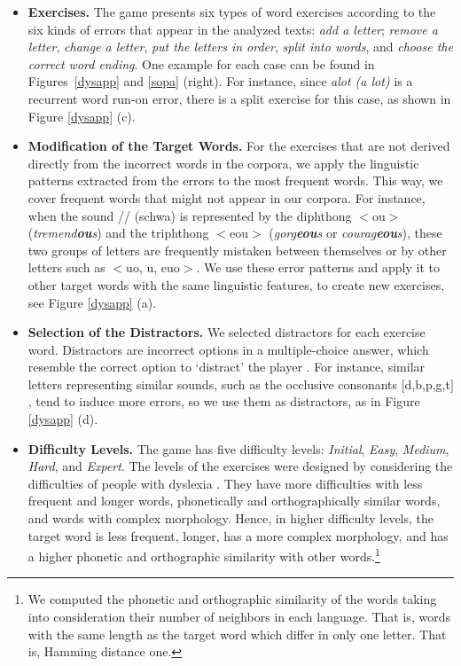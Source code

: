 \documentclass[letterpaper]{sig-alternate-2013}
\begin{document}
\begin{itemize}
\item[(1)]{\bf Exercises.}
The game presents six types of word exercises according to the six kinds of errors that appear in the analyzed texts: {\it add a letter}; {\it remove a letter}, {\it change a letter}, {\it put the letters in order},  {\it split into words}, and {\it choose the correct word ending}. One example for each case can be found in Figures~\ref{dysapp} and \ref{sopa} (right). For instance, since {\it *alot (a lot)}  is a recurrent word run-on error, there is a split exercise for this case, as shown in Figure \ref{dysapp} (c). 

\item[(2)]{\bf Modification of the Target Words.}
For the exercises that are not derived directly from the incorrect words in the corpora, we apply the linguistic patterns extracted from the errors to the most frequent words. This way, we cover frequent words that might not appear in our corpora.  For instance, when the sound /\textschwa/ (schwa) is represented by the diphthong $<$ou$>$ ({\it tremend\textbf{\textit{ou}}s}) and the triphthong $<$eou$>$ ({\it gorg\textbf{\textit{eou}}s} or {\it courag\textbf{\textit{eou}}s}), these two groups of letters are frequently mistaken between themselves or by other letters such as $<$uo, u, euo$>$. We use these error patterns and apply it to other target words with the same linguistic features, to create new exercises, see Figure \ref{dysapp} (a). 

\item[(3)]{\bf Selection of the Distractors.}
We selected distractors for each exercise word. Distractors are incorrect options in a multiple-choice answer, which resemble the correct option to `distract' the player \cite{mitkov2009semantic}. For instance, similar letters representing similar sounds, such as the occlusive consonants $[$d,b,p,g,t$]$, tend to induce more errors, so we use them as distractors, as in Figure \ref{dysapp} (d).

\item[(4)]{\bf Difficulty Levels.}
The game has five difficulty levels:  {\it Initial},  {\it Easy}, {\it Medium}, {\it Hard}, and {\it Expert}. The levels of the exercises were designed by considering the difficulties of people with dyslexia \cite{Gregor2000}. They have more difficulties with less frequent and longer words, phonetically and orthographically similar words, and words with complex morphology. Hence, in higher difficulty levels, the target word is less frequent, longer, has a more complex morphology, and has a higher phonetic and orthographic similarity with other words.\footnote{We computed the phonetic and orthographic similarity of the words taking into consideration their number of neighbors in each language. That is, words with the same length as the target word which differ in only one letter. That is, Hamming distance one.}
\end{itemize}
\end{document}
